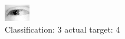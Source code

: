 \begin{figure}[h!]
\begin{center}
\includegraphics[width=0.60\columnwidth]{figures/ID2461_class_3_target_4.png}
\end{center}
\caption{ Classification: 3 actual target: 4}
\label{fig:ID2461_class_3_target_4}
\end{figure}
